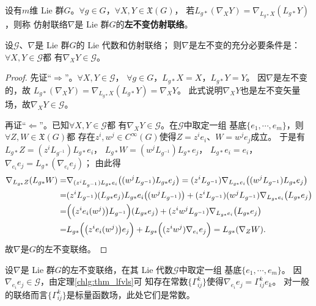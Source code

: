 \begin{definition}
    设有$m$维 Lie 群$G$。$\forall g\in G$，$\forall X,Y\in \mathfrak{X}(G)$，
    若$L_{g*}(\nabla_X Y) = \nabla_{L_{g*}X}(L_{g*}Y)$，则称
    仿射联络$\nabla$是 Lie 群$G$的\textbf{左不变仿射联络}。
\end{definition}

\begin{theorem}
    设$\mathscr{G}$、$\nabla$是 Lie 群$G$的 Lie 代数和仿射联络；
    则$\nabla$是左不变的充分必要条件是：$\forall X,Y \in \mathscr{G}$都
    有$\nabla_X Y\in \mathscr{G}$。
\end{theorem}
\begin{proof}
    先证“$\Rightarrow$”。$\forall X,Y \in \mathscr{G}$，
    $\forall g\in G$，$L_{g*} X = X$，$L_{g*} Y = Y$。
    因$\nabla$是左不变的，故
    $    L_{g*}(\nabla_X Y) = \nabla_{L_{g*}X}(L_{g*}Y) = \nabla_{X}Y $。
    此式说明$\nabla_X Y$也是左不变矢量场，故$\nabla_X Y\in \mathscr{G}$。

    再证“$\Leftarrow$”。已知$\forall X,Y \in \mathscr{G}$都
    有$\nabla_X Y\in \mathscr{G}$。在$\mathscr{G}$中取定一组
    基底$\{e_1,\cdots,e_m\}$，则$\forall Z,W\in \mathfrak{X}(G)$都
    存在$z^i,w^j\in C^\infty(G)$使得$Z=z^i e_i$、$W=w^j e_j$成立。    于是有
    $L_{g*}Z = (z^i L_{g^{-1}}) L_{g*} e_i$，
    $L_{g*}W = (w^j L_{g^{-1}}) L_{g*} e_j$，
    $L_{g*}e_i = e_i$，
    $\nabla_{e_i} e_j = L_{g*}(\nabla_{e_i} e_j)$；
    由此得
    \begin{align*}
        \nabla_{L_{g*}Z} (L_{g*}W)= & \nabla_{(z^i L_{g^{-1}}) L_{g*} e_i }
        \bigl( (w^j L_{g^{-1}}) L_{g*} e_j \bigr)
        =(z^i L_{g^{-1}}) \nabla_{ L_{g*} e_i }\bigl( (w^j L_{g^{-1}}) L_{g*} e_j \bigr) \\
        =&(z^i L_{g^{-1}}) (L_{g*} e_j) L_{g*} e_i \bigl( (w^j L_{g^{-1}})  \bigr)
        + (z^i L_{g^{-1}}) (w^j L_{g^{-1}})  \nabla_{ L_{g*} e_i }\bigl( L_{g*} e_j \bigr) \\
        =& \Bigl( \bigl(z^i e_i(w^j) \bigr)L_{g^{-1}}\Bigr) (L_{g*} e_j)
        + (z^i w^j L_{g^{-1}}) \nabla_{ L_{g*} e_i }\bigl( L_{g*} e_j \bigr)  \\
        =& L_{g*}\Bigl( \bigl(z^i e_i(w^j) \bigr) e_j \Bigr)
        +L_{g*}\Bigl( (z^i w^j ) \nabla_{e_i} e_j\Bigr)
        =L_{g*} (\nabla_Z W ) .
    \end{align*}
    故$\nabla$是$G$的左不变联络。
\end{proof}

设$\nabla$是 Lie 群$G$的左不变联络，在其 Lie 代数$\mathscr{G}$中取定一组
基底$\{e_1,\cdots,e_m\}$。
因$\nabla_{e_i} e_j \in \mathscr{G}$，由定理\ref{chlg:thm_lfvls}可
知存在{常数}$\{\Gamma^k_{i j}\}$使得$\nabla_{e_i} e_j= \Gamma^k_{i j} e_k$。
对一般的联络而言$\{\Gamma^k_{i j}\}$是标量函数场，此处它们是{常数}。

